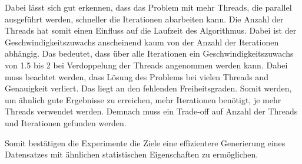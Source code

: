 \documentclass[sigconf]{acmart}
\begin{document}
Dabei lässt sich gut erkennen, dass das Problem mit mehr Threads, die parallel ausgeführt werden, schneller die Iterationen abarbeiten kann. Die Anzahl der Threads hat somit einen Einfluss auf die Laufzeit des Algorithmus. Dabei ist der Geschwindigkeitszuwachs anscheinend kaum von der Anzahl der Iterationen abhängig. Das bedeutet, dass über alle Iterationen ein Geschwindigkeitszuwachs von 1.5 bis 2 bei Verdoppelung der Threads angenommen werden kann. Dabei muss beachtet werden, dass Lösung des Problems bei vielen Threads and Genauigkeit verliert. Das liegt an den fehlenden Freiheitsgraden. Somit werden, um ähnlich gute Ergebnisse zu erreichen, mehr Iterationen benötigt, je mehr Threads verwendet werden. Demnach muss ein Trade-off auf Anzahl der Threads und Iterationen gefunden werden.

Somit bestätigen die Experimente die Ziele eine effizientere Generierung eines Datensatzes mit ähnlichen statistischen Eigenschaften zu ermöglichen.   










\end{document}
